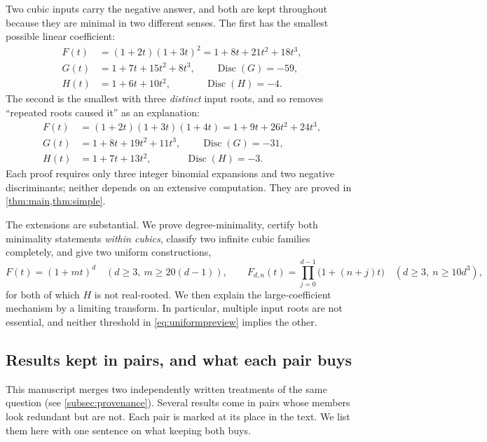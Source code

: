 \documentclass[11pt,letterpaper]{article}
\numberwithin{equation}{section}
\theoremstyle{definition}
\theoremstyle{remark}
\newcommand{\Disc}{\operatorname{Disc}}
\begin{document}
Two cubic inputs carry the negative answer, and both are kept throughout
because they are minimal in two different senses.
The first has the smallest possible linear coefficient:
\begin{equation}\label{eq:maintriple}
\begin{aligned}
 F(t)&=(1+2t)(1+3t)^2=1+8t+21t^2+18t^3,\\
 G(t)&=1+7t+15t^2+8t^3,\qquad \Disc(G)=-59,\\
 H(t)&=1+6t+10t^2,\qquad\quad\ \ \Disc(H)=-4.
\end{aligned}
\end{equation}
The second is the smallest with three \emph{distinct} input roots, and so
removes ``repeated roots caused it'' as an explanation:
\begin{equation}\label{eq:simpletriple}
\begin{aligned}
 F(t)&=(1+2t)(1+3t)(1+4t)=1+9t+26t^2+24t^3,\\
 G(t)&=1+8t+19t^2+11t^3,\qquad \Disc(G)=-31,\\
 H(t)&=1+7t+13t^2,\qquad\quad\ \ \Disc(H)=-3.
\end{aligned}
\end{equation}
Each proof requires only three integer binomial expansions and two negative
discriminants; neither depends on an extensive computation. They are proved
in \cref{thm:main,thm:simple}.

The extensions are substantial. We prove degree-minimality, certify both
minimality statements \emph{within cubics}, classify two infinite cubic
families completely, and give two uniform constructions,
\begin{equation}\label{eq:uniformpreview}
 F(t)=(1+mt)^d\quad(d\ge3,\ m\ge20(d-1)),
 \qquad
 F_{d,n}(t)=\prod_{j=0}^{d-1}\bigl(1+(n+j)t\bigr)\quad(d\ge3,\ n\ge10d^3),
\end{equation}
for both of which $H$ is not real-rooted. We then explain the
large-coefficient mechanism by a limiting transform. In particular, multiple
input roots are not essential, and neither threshold in
\eqref{eq:uniformpreview} implies the other.

\subsection{Results kept in pairs, and what each pair buys}
\label{subsec:pairs}

This manuscript merges two independently written treatments of the same
question (see \cref{subsec:provenance}). Several results come in pairs whose
members look redundant but are not. Each pair is marked at its place in the
text. We list them here with one sentence on what keeping both buys.
\end{document}
